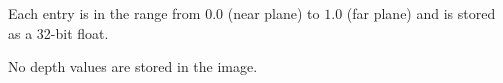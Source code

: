 
  \begin{Description}
  \item[\CEnum{ICET\_IMAGE\_DEPTH\_FLOAT}] Each entry is in the range from
    $0.0$ (near plane) to $1.0$ (far plane) and is stored as a 32-bit
    float.
  \item[\CEnum{ICET\_IMAGE\_DEPTH\_NONE}] No depth values are stored in the
    image.
  \end{Description}
